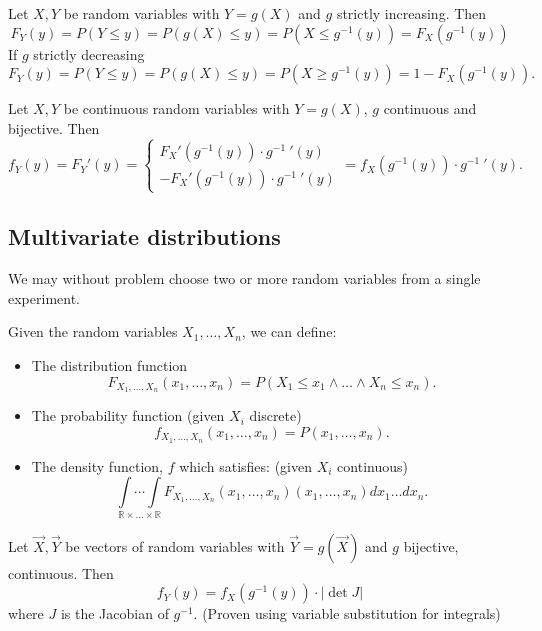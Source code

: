 \begin{theorem}
	Let \(X, Y\) be random variables with \(Y= g(X)\) and \(g\) strictly increasing. Then
	\[
		F_Y(y) = P(Y \leq y) = P(g(X) \leq y) = P(X \leq g^{-1}(y)) = F_X(g^{-1}(y))
	\]
	If \(g\) strictly decreasing
	\[
		F_Y(y) = P(Y \leq y) = P(g(X) \leq y) = P(X \geq g^{-1}(y)) = 1 - F_X(g^{-1}(y)).
	\]
\end{theorem}


\begin{theorem}
	Let \(X, Y\) be continuous random variables with \(Y= g(X)\), \(g\) continuous and bijective. Then 
	\[
		f_Y(y) = F_Y'(y) = \begin{cases} F_X'(g^{-1}(y)) \cdot g^{-1} ~'(y) \\ -F_X'(g^{-1}(y)) \cdot g^{-1} ~'(y) \end{cases} = f_X(g^{-1}(y)) \cdot g^{-1} ~'(y).
	\]
\end{theorem}

\subsection{Multivariate distributions}
\begin{obs}
	We may without problem choose two or more random variables from a single experiment.
\end{obs}

\begin{definition}
	Given the random variables \(X_1, \dots , X_n\), we can define:
	\begin{itemize}
		\item The distribution function
			\[
				F_{X_1, \dots , X_n}(x_1, \dots , x_n) = P(X_1 \leq x_1 \land \dots \land X_n \leq x_n).
			\]
		\item The probability function (given \(X_i\) discrete)
			\[
				f_{X_1, \dots , X_n}(x_1, \dots , x_n) = P(x_1, \dots, x_n).
			\]
		\item The density function, \(f\) which satisfies: (given \(X_i\) continuous)
			\[
				\underset{\mathbb{R} \times \dots \times \mathbb{R}}{\int \cdots \int} F _{X_1, \dots, X_n}(x_1, \dots ,x_n) (x_1, \dots, x_n) dx_1 \dots dx_n.
			\]
	\end{itemize}
\end{definition}


\begin{theorem} %
	Let \(\vec{X}, \vec{Y}\) be vectors of random variables with \(\vec{Y} = g(\vec{X})\) and \(g\) bijective, continuous. Then
	\[
		f_Y(y) = f_X(g^{-1}(y))  \cdot |\det J| 
	\]
	where \(J\) is the Jacobian of \(g^{-1}\). (Proven using variable substitution for integrals)
\end{theorem}

